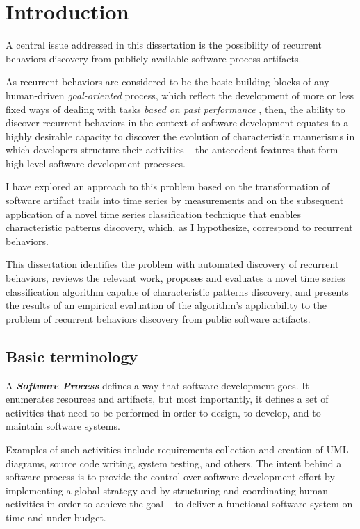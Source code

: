 \chapter{Introduction}\label{chapter_introduction}
A central issue addressed in this dissertation is the possibility of recurrent behaviors discovery 
from publicly available software process artifacts. 

As recurrent behaviors are considered to be the basic building blocks of any human-driven
\textit{goal-oriented} process, which reflect the development of more or less fixed ways of dealing 
with tasks \textit{based on past performance} \cite{neal2012habits} \cite{1903}, 
then, the ability to discover recurrent behaviors in the context of software development equates 
to a highly desirable capacity to discover the evolution of characteristic mannerisms in which developers 
structure their activities -- the antecedent features that form high-level software development processes. 

I have explored an approach to this problem based on the transformation of software artifact trails 
into time series by measurements and on the subsequent application of a novel time series 
classification technique that enables characteristic patterns discovery, which, as
I hypothesize, correspond to recurrent behaviors.

This dissertation 
identifies the problem with automated discovery of recurrent behaviors, 
reviews the relevant work, 
proposes and evaluates a novel time series classification algorithm capable of characteristic patterns discovery, 
and presents the results of an empirical evaluation of the algorithm's applicability to the problem 
of recurrent behaviors discovery from public software artifacts.

\section{Basic terminology}\label{section_terminology}
\begin{defn}\label{def_process}
A \textbf{\textit{Software Process}} defines a way that software development goes. It enumerates
resources and artifacts, but most importantly, it defines a set of activities that need to be 
performed in order to design, to develop, and to maintain software systems.
\end{defn}
Examples of such activities include requirements collection and creation of UML diagrams, 
source code writing, system testing, and others. The intent behind a software process is to provide 
the control over software development effort by implementing a global strategy and by structuring
and coordinating human activities in order to achieve the goal -- to deliver a functional
software system on time and under budget. 

